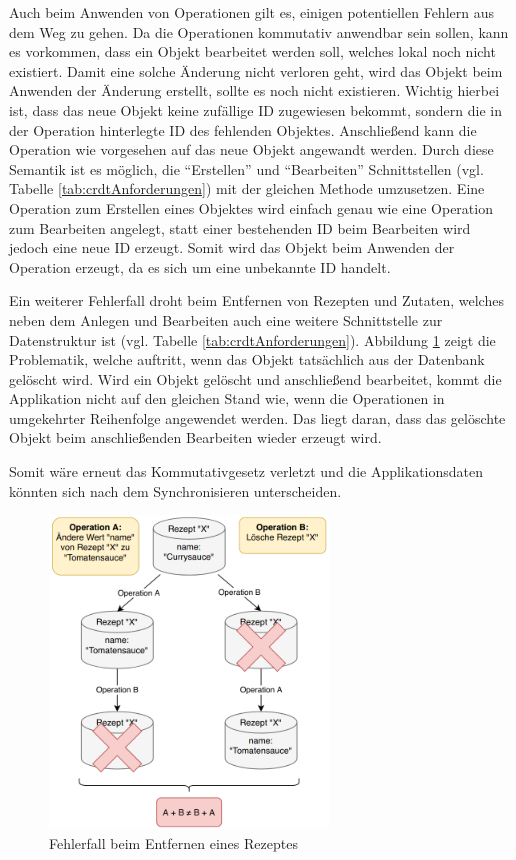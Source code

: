 \documentclass[a4paper, 12pt]{scrreprt}
\begin{document}
Auch beim Anwenden von Operationen gilt es, einigen potentiellen Fehlern aus dem Weg zu gehen. Da die Operationen kommutativ anwendbar sein sollen, kann es vorkommen, dass ein Objekt bearbeitet werden soll, welches lokal noch nicht existiert. Damit eine solche Änderung nicht verloren geht, wird das Objekt beim Anwenden der Änderung erstellt, sollte es noch nicht existieren. Wichtig hierbei ist, dass das neue Objekt keine zufällige ID zugewiesen bekommt, sondern die in der Operation hinterlegte ID des fehlenden Objektes. Anschließend kann die Operation wie vorgesehen auf das neue Objekt angewandt werden. Durch diese Semantik ist es möglich, die \enquote{Erstellen} und \enquote{Bearbeiten} Schnittstellen (vgl. Tabelle \ref{tab:crdtAnforderungen}) mit der gleichen Methode umzusetzen. Eine Operation zum Erstellen eines Objektes wird einfach genau wie eine Operation zum Bearbeiten angelegt, statt einer bestehenden ID beim Bearbeiten wird jedoch eine neue ID erzeugt. Somit wird das Objekt beim Anwenden der Operation erzeugt, da es sich um eine unbekannte ID handelt. 

Ein weiterer Fehlerfall droht beim Entfernen von Rezepten und Zutaten, welches neben dem Anlegen und Bearbeiten auch eine weitere Schnittstelle zur Datenstruktur ist (vgl. Tabelle \ref{tab:crdtAnforderungen}). Abbildung \ref{fig:rezeptLöschenSchlecht} zeigt die Problematik, welche auftritt, wenn das Objekt tatsächlich aus der Datenbank gelöscht wird. Wird ein Objekt gelöscht und anschließend bearbeitet, kommt die Applikation nicht auf den gleichen Stand wie, wenn die Operationen in umgekehrter Reihenfolge angewendet werden. Das liegt daran, dass das gelöschte Objekt beim anschließenden Bearbeiten wieder erzeugt wird. 

Somit wäre erneut das Kommutativgesetz verletzt und die Applikationsdaten könnten sich nach dem Synchronisieren unterscheiden. 

\begin{figure}[H]
	\centering
	\includegraphics[width=0.66\textwidth]{deleteRecipeBad.png}
	\caption{Fehlerfall beim Entfernen eines Rezeptes}
	\label{fig:rezeptLöschenSchlecht}
\end{figure}
\end{document}
